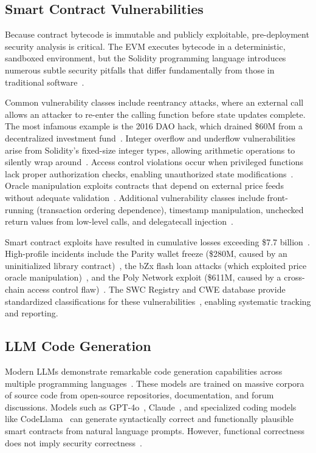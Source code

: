 \subsection{Smart Contract Vulnerabilities}

Because contract bytecode is immutable and publicly exploitable, pre-deployment security analysis is critical. The EVM executes bytecode in a deterministic, sandboxed environment, but the Solidity programming language introduces numerous subtle security pitfalls that differ fundamentally from those in traditional software~\cite{atzei2017survey}.

Common vulnerability classes include reentrancy attacks, where an external call allows an attacker to re-enter the calling function before state updates complete. The most infamous example is the 2016 DAO hack, which drained \$60M from a decentralized investment fund~\cite{dao_hack}. Integer overflow and underflow vulnerabilities arise from Solidity's fixed-size integer types, allowing arithmetic operations to silently wrap around~\cite{torres2018integer}. Access control violations occur when privileged functions lack proper authorization checks, enabling unauthorized state modifications~\cite{chen2020defining}. Oracle manipulation exploits contracts that depend on external price feeds without adequate validation~\cite{qin2023attacks}. Additional vulnerability classes include front-running (transaction ordering dependence), timestamp manipulation, unchecked return values from low-level calls, and delegatecall injection~\cite{atzei2017survey, perez2021smart}.

Smart contract exploits have resulted in cumulative losses exceeding \$7.7 billion~\cite{zhou2023sok}. High-profile incidents include the Parity wallet freeze (\$280M, caused by an uninitialized library contract)~\cite{perez2021smart}, the bZx flash loan attacks (which exploited price oracle manipulation)~\cite{qin2021attacking}, and the Poly Network exploit (\$611M, caused by a cross-chain access control flaw)~\cite{zhou2023sok}. The SWC Registry and CWE database provide standardized classifications for these vulnerabilities~\cite{swc_registry}, enabling systematic tracking and reporting.

\subsection{LLM Code Generation}

Modern LLMs demonstrate remarkable code generation capabilities across multiple programming languages~\cite{chen2021evaluating, nijkamp2023codegen, li2023starcoder}. These models are trained on massive corpora of source code from open-source repositories, documentation, and forum discussions. Models such as GPT-4o~\cite{openai_gpt4}, Claude~\cite{anthropic_claude}, and specialized coding models like CodeLlama~\cite{codellama} can generate syntactically correct and functionally plausible smart contracts from natural language prompts. However, functional correctness does not imply security correctness~\cite{copilot_eval, tony2023llmSecEval}.

